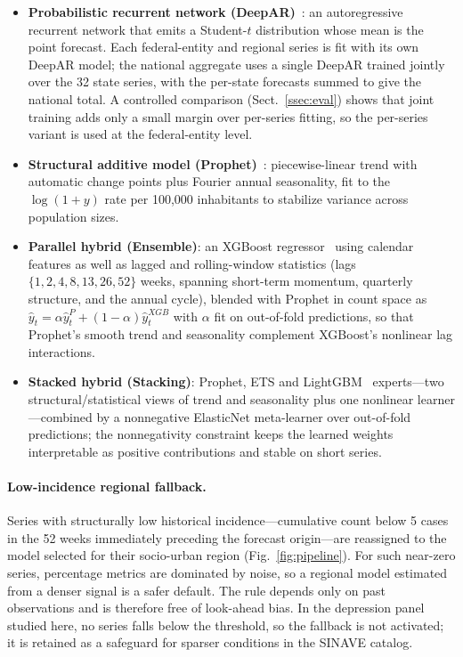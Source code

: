 \documentclass[runningheads]{llncs}
\begin{document}
\begin{itemize}
\item \textbf{Probabilistic recurrent network (DeepAR)}~\cite{alexandrov2020,salinas2020}:
an autoregressive recurrent network that emits a Student-$t$
distribution whose mean is the point forecast. Each federal-entity and
regional series is fit with its own DeepAR model; the national
aggregate uses a single DeepAR trained jointly over the 32 state series,
with the per-state forecasts summed to give the national total. A controlled
comparison (Sect.~\ref{ssec:eval}) shows that joint training adds only a
small margin over per-series fitting, so the per-series variant is used
at the federal-entity level.
\item \textbf{Structural additive model (Prophet)}~\cite{taylor2018}:
piecewise-linear trend with automatic change points plus Fourier annual
seasonality, fit to the $\log(1{+}y)$ rate per 100{,}000 inhabitants
to stabilize variance across population sizes.
\item \textbf{Parallel hybrid (Ensemble)}: an XGBoost
regressor~\cite{chen2016} using calendar features as well as lagged
and rolling-window statistics (lags $\{1,2,4,8,13,26,52\}$ weeks,
spanning short-term momentum, quarterly structure, and the annual
cycle), blended with Prophet in count space as
$\hat{y}_t=\alpha\hat{y}^{P}_t+(1{-}\alpha)\hat{y}^{XGB}_t$ with
$\alpha$ fit on out-of-fold predictions, so that Prophet's smooth
trend and seasonality complement XGBoost's nonlinear lag interactions.
\item \textbf{Stacked hybrid (Stacking)}: Prophet, ETS and
LightGBM~\cite{ke2017} experts---two structural/statistical views of
trend and seasonality plus one nonlinear learner---combined by a
nonnegative ElasticNet meta-learner over out-of-fold predictions; the
nonnegativity constraint keeps the learned weights interpretable as
positive contributions and stable on short series.
\end{itemize}

\paragraph{Low-incidence regional fallback.}
Series with structurally low historical incidence---cumulative count
below 5 cases in the 52 weeks immediately preceding the forecast
origin---are reassigned to the model selected for their socio-urban
region (Fig.~\ref{fig:pipeline}). For such near-zero series, percentage
metrics are dominated by noise, so a regional model
estimated from a denser signal is a safer default. The rule depends
only on past observations and is therefore free of look-ahead bias. In
the depression panel studied here, no series falls below the threshold,
so the fallback is not activated; it is retained as a safeguard for
sparser conditions in the SINAVE catalog.
\end{document}
